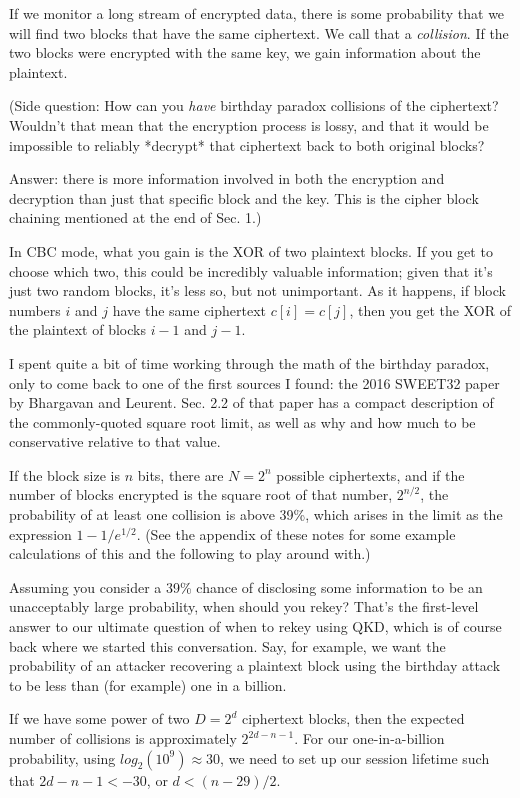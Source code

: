 If we monitor a long stream of encrypted data, there is some
probability that we will find two blocks that have the same
ciphertext.  We call that a \emph{collision}.  If the two blocks were
encrypted with the same key, we gain information about the plaintext.

(Side question: How can you \emph{have} birthday paradox collisions of the
ciphertext?  Wouldn't that mean that the encryption process is lossy,
and that it would be impossible to reliably *decrypt* that ciphertext
back to both original blocks?

Answer: there is more information involved in both the encryption and
decryption than just that specific block and the key.  This is the
cipher block chaining mentioned at the end of Sec. 1.)

In CBC mode, what you gain is the XOR of two plaintext blocks.  If you
get to choose which two, this could be incredibly valuable
information; given that it's just two random blocks, it's less so, but
not unimportant.  As it happens, if block numbers $i$ and $j$ have the
same ciphertext $c[i] = c[j]$, then you get the XOR of the plaintext of
blocks $i-1$ and $j-1$.

I spent quite a bit of time working through the math of the birthday
paradox, only to come back to one of the first sources I found: the
2016 SWEET32 paper by Bhargavan and Leurent.  Sec. 2.2 of that paper
has a compact description of the commonly-quoted square root limit, as
well as why and how much to be conservative relative to that value.

If the block size is $n$ bits, there are $N = 2^n$ possible
ciphertexts, and if the number of blocks encrypted is the square root
of that number, $2^{n/2}$, the probability of at least one collision
is above 39\%, which arises in the limit as the expression
$1-1/e^{1/2}$.  (See the appendix of these notes for some example
calculations of this and the following to play around with.)

Assuming you consider a 39\% chance of disclosing some information to
be an unacceptably large probability, when should you rekey?  That's
the first-level answer to our ultimate question of when to rekey using
QKD, which is of course back where we started this conversation.  Say,
for example, we want the probability of an attacker recovering a
plaintext block using the birthday attack to be less than (for
example) one in a billion.

If we have some power of two $D = 2^d$ ciphertext blocks, then the
expected number of collisions is approximately $2^{2d-n-1}$.  For our
one-in-a-billion probability, using $log_2(10^9) \approx 30$, we need
to set up our session lifetime such that $2d-n-1 < -30$, or $d <
(n-29)/2$.

